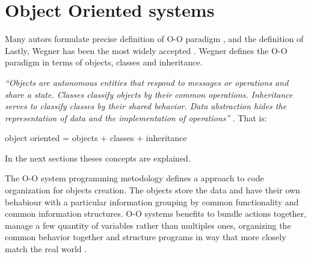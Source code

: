 \section{Object Oriented systems}



Many autors formulate precise 
definition of O-O paradigm 
\cite{Rentsch:1982} 
\cite{Pascoe:1986}
\cite{Nygaard:1986}
\cite{Madsen:1988}, 
and the definition of Lastly, Wegner 
\cite{Wegner:1987} has been 
the most widely 
accepted \cite{Capretz:2003}. Wegner defines 
the O-O paradigm in terms of objects, 
classes and inheritance.

\emph{
	``Objects are autonomous entities 
	that respond to messages or operations and share 
	a state. Classes classify objects by their common 
	operations. Inheritance serves to classify classes by 
	their shared behavior. Data abstraction hides the 
	representation of data and the implementation of 
	operations'' 
}\cite{Wegner:1987}. That is: 

object oriented = objects + classes + inheritance

In the next sections theses concepts are explained.

The O-O system programming metodology 
defines a approach to code organization 
for objects creation. 
The objects store the data and 
have their own behabiour with a 
particular information grouping 
by common functionality and common 
information structures. 
O-O systems benefits 
to bundle actions together, 
manage a few quantity of variables rather 
than multiples ones, 
organizing the 
common behavior together and 
structure programs in way that more closely 
match the real world \cite{Adobe:AS3man2008}. 

